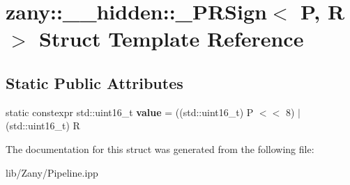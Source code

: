\hypertarget{structzany_1_1____hidden_1_1___p_r_sign}{}\section{zany\+:\+:\+\_\+\+\_\+hidden\+:\+:\+\_\+\+P\+R\+Sign$<$ P, R $>$ Struct Template Reference}
\label{structzany_1_1____hidden_1_1___p_r_sign}
\subsection*{Static Public Attributes}
\begin{DoxyCompactItemize}
\item 
\mbox{\label{structzany_1_1____hidden_1_1___p_r_sign_a5de728f31e6265c1e70c75abcf403d72}} 
static constexpr std\+::uint16\+\_\+t {\bfseries value} = ((std\+::uint16\+\_\+t) P $<$$<$ 8) $\vert$ (std\+::uint16\+\_\+t) R
\end{DoxyCompactItemize}


The documentation for this struct was generated from the following file\+:\begin{DoxyCompactItemize}
\item 
lib/\+Zany/Pipeline.\+ipp\end{DoxyCompactItemize}
